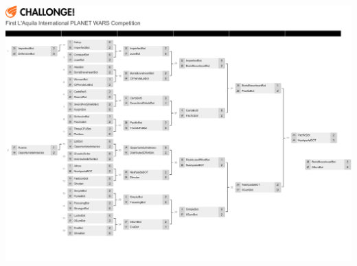\documentclass[12pt]{scrartcl}
\begin{document}
	\includegraphics[height=10.5in, width=7in]{graphics/contest_results.pdf}
	
\end{document}
